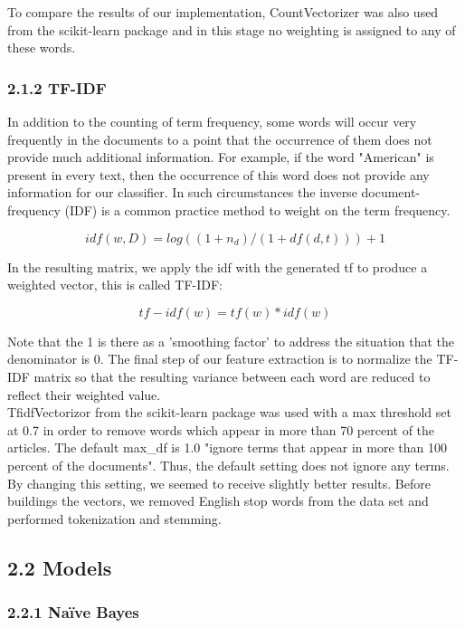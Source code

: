 \documentclass{neu_handout}
\begin{document}
To compare the results of our implementation, CountVectorizer was also used from the scikit-learn package and in this stage no weighting is assigned to any of these words.


\subsubsection*{2.1.2 TF-IDF}
In addition to the counting of term frequency, some words will occur very frequently in the documents to a point that the occurrence of them does not provide much additional information. For example, if the word "American" is present in every text, then the occurrence of this word does not provide any information for our classifier. In such circumstances the inverse document-frequency (IDF) is a common practice method to weight on the term frequency.

$$idf(w,D)=log((1+n_d)/(1+df(d,t)))+1$$

In the resulting matrix, we apply the idf with the generated tf to produce a weighted vector, this is called TF-IDF:

$$tf-idf(w)=tf(w)*idf(w)$$

Note that the 1 is there as a 'smoothing factor' to address the situation that the denominator is 0. The final step of our feature extraction is to normalize the TF-IDF matrix so that the resulting variance between each word are reduced to reflect their weighted value.\\

TfidfVectorizor from the scikit-learn package was used with a max threshold set at 0.7 in order to remove words which appear in more than 70 percent of the articles. The default max\_df is 1.0 "ignore terms that appear in more than 100 percent of the documents". Thus, the default setting does not ignore any terms. By changing this setting, we seemed to receive slightly better results. Before buildings the vectors, we removed English stop words from the data set and performed tokenization and stemming.

\subsection*{2.2 Models}



\subsubsection*{2.2.1 Na\"ive Bayes}
\end{document}

